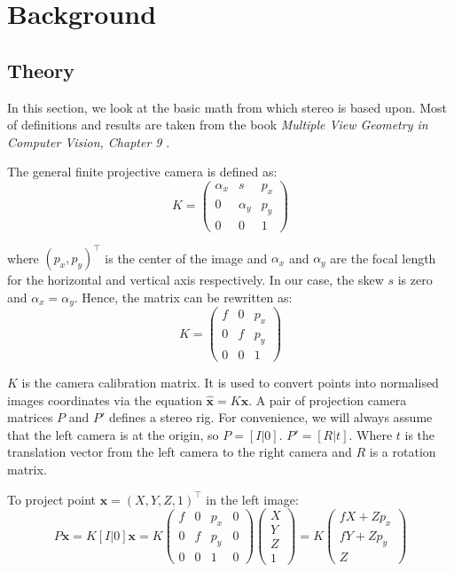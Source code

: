 \documentclass[11pt]{report}
\begin{document}
\chapter{Background}
\section{Theory}

In this section, we look at the basic math from which stereo is based upon. Most of definitions and results are taken from the book \textit{Multiple View Geometry in Computer Vision, Chapter 9} \cite{Geom}.
 
The general finite projective camera is defined as:
\[
K = 
\left (
\begin{matrix}
	\alpha_x & s & p_x \\
	0 & \alpha_y & p_y \\
	0 & 0 & 1
\end{matrix}
\right )
\]

where $(p_x, p_y)^\top$ is the center of the image and $\alpha_x$ and $\alpha_y$ are the focal length for the horizontal and vertical axis respectively.  In our case, the skew $s$ is zero and $\alpha_x = \alpha_y$. Hence, the matrix can be rewritten as: 
\begin{equation}
K = 
\left (
\begin{matrix}
	f & 0 & p_x \\
	0 & f & p_y \\
	0 & 0 & 1
\end{matrix}
\right )
  \label{eq:camera_matrix}
\end{equation}

$K$ is the camera calibration matrix. It is used to convert points into normalised images coordinates via the equation $\hat{\mathbf{x}} = K\mathbf{x}$.
A pair of projection camera matrices $P$ and $P'$ defines a stereo rig. For convenience, we will always assume that the left camera is at the origin, so $P = [I|0]$. $P'=[R|t]$. Where $t$ is the translation vector from the left camera to the right camera and $R$ is a rotation matrix.

To project point $\mathbf{x} = (X, Y, Z, 1)^\top$ in the left image:
\[
P\mathbf{x} = K[I|0]\mathbf{x} =  K
\left (
\begin{matrix}
	f & 0 & p_x & 0\\
	0 & f & p_y & 0\\
	0 & 0 & 1   & 0
\end{matrix}
\right )
\left (
\begin{matrix}
	X \\
	Y \\
	Z \\
	1
\end{matrix}
\right )
= K
\left (
\begin{matrix}
	fX + Zp_x \\
	fY + Zp_y \\
	Z
\end{matrix}
\right )
\]
\end{document}
